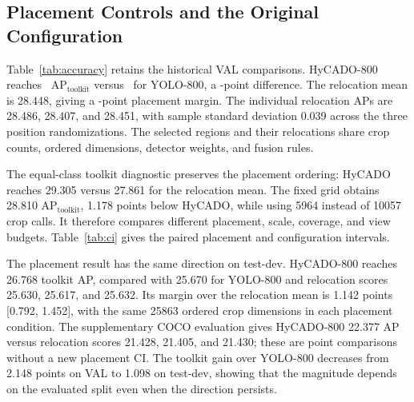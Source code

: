 \documentclass[journal]{IEEEtran}
\newcommand{\APlit}{\mathrm{AP}_{\mathrm{toolkit}}}
\begin{document}
\subsection{Placement Controls and the Original Configuration}
Table~\ref{tab:accuracy} retains the historical VAL comparisons. HyCADO-800 reaches \APHybrid\ $\APlit$ versus \APYolo\ for YOLO-800, a \GainYolo-point difference. The relocation mean is 28.448, giving a \GainLocation-point placement margin. The individual relocation APs are 28.486, 28.407, and 28.451, with sample standard deviation 0.039 across the three position randomizations. The selected regions and their relocations share crop counts, ordered dimensions, detector weights, and fusion rules.

\begin{table}[t]
\caption{Historical toolkit accuracy on all 548 VisDrone VAL images. SAHI suffixes give slice size. Relocation averages three separate placement scores. Macro AP is the equal-class toolkit diagnostic, distinct from COCO-style AP. HyCADO v1 denotes HyCADO-800.}
\label{tab:accuracy}
\centering\small
\end{table}

The equal-class toolkit diagnostic preserves the placement ordering: HyCADO reaches 29.305 versus 27.861 for the relocation mean. The fixed grid obtains 28.810 $\APlit$, 1.178 points below HyCADO, while using 5964 instead of 10057 crop calls. It therefore compares different placement, scale, coverage, and view budgets. Table~\ref{tab:ci} gives the paired placement and configuration intervals.

\begin{table}[t]
\caption{Historical VAL toolkit AP differences and marginal 95\% proxy-cluster bootstrap intervals, conditional on the retained models.}
\label{tab:ci}
\centering\small
\end{table}

The placement result has the same direction on test-dev. HyCADO-800 reaches 26.768 toolkit AP, compared with 25.670 for YOLO-800 and relocation scores 25.630, 25.617, and 25.632. Its margin over the relocation mean is 1.142 points [0.792, 1.452], with the same 25863 ordered crop dimensions in each placement condition. The supplementary COCO evaluation gives HyCADO-800 22.377 AP versus relocation scores 21.428, 21.405, and 21.430; these are point comparisons without a new placement CI. The toolkit gain over YOLO-800 decreases from 2.148 points on VAL to 1.098 on test-dev, showing that the magnitude depends on the evaluated split even when the direction persists.
\end{document}

